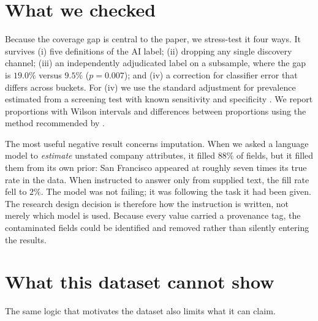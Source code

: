 \documentclass[11pt]{article}
\begin{document}
\section{What we checked}
\label{sec:checks}

Because the coverage gap is central to the paper, we stress-test it four ways.
It survives (i) five definitions of the AI label; (ii) dropping any single
discovery channel; (iii) an independently adjudicated label on a subsample,
where the gap is $19.0\%$ versus $9.5\%$ ($p = 0.007$); and (iv) a correction
for classifier error that differs across buckets. For (iv) we use the standard
adjustment for prevalence estimated from a screening test with known
sensitivity and specificity \citep{rogan1978prevalence}. We report proportions
with Wilson intervals \citep{wilson1927interval} and differences between
proportions using the method recommended by \citet{newcombe1998intervals}.

The most useful negative result concerns imputation. When we asked a language
model to \emph{estimate} unstated company attributes, it filled $88\%$ of
fields, but it filled them from its own prior: San Francisco appeared at
roughly seven times its true rate in the data. When instructed to answer only
from supplied text, the fill rate fell to $2\%$. The model was not
failing; it was following the task it had been given. The research design
decision is therefore how the instruction is written, not merely which model is
used.
Because every value carried a provenance tag, the contaminated fields could be
identified and removed rather than silently entering the results.

\section{What this dataset cannot show}

The same logic that motivates the dataset also limits what it can claim.
\end{document}
